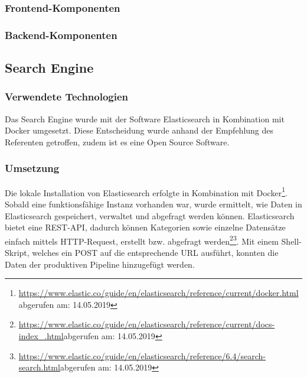 \subsubsection{Frontend-Komponenten}
\subsubsection{Backend-Komponenten}
\subsection{Search Engine}
\subsubsection{Verwendete Technologien}
Das Search Engine wurde mit der Software Elasticsearch in Kombination mit Docker umgesetzt.
Diese Entscheidung wurde anhand der Empfehlung des Referenten getroffen, zudem ist es eine Open Source Software.
\subsubsection{Umsetzung}
Die lokale Installation von Elasticsearch erfolgte in Kombination mit Docker\footnote{\url{https://www.elastic.co/guide/en/elasticsearch/reference/current/docker.html}abgerufen am: 14.05.2019}.
Sobald eine funktionsfähige Instanz vorhanden war, wurde ermittelt, wie Daten in Elasticsearch gespeichert, verwaltet und abgefragt werden können.
Elasticsearch bietet eine REST-API, dadurch können Kategorien sowie einzelne Datensätze einfach mittels HTTP-Request, erstellt bzw. abgefragt werden\footnote{\url{https://www.elastic.co/guide/en/elasticsearch/reference/current/docs-index_.html}abgerufen am: 14.05.2019}\footnote{\url{https://www.elastic.co/guide/en/elasticsearch/reference/6.4/search-search.html}abgerufen am: 14.05.2019}.
Mit einem Shell-Skript, welches ein POST auf die entsprechende URL ausführt, konnten die Daten der produktiven Pipeline hinzugefügt werden.
